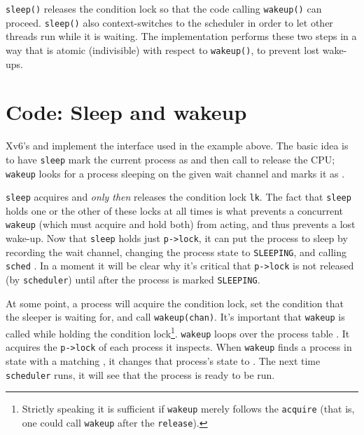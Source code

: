{\tt sleep()} releases the condition lock so that the code calling
{\tt wakeup()} can proceed. {\tt sleep()} also context-switches to the
scheduler in order to let other threads run while it is waiting. The
implementation performs these two steps in a way that is atomic
(indivisible) with respect to {\tt wakeup()}, to prevent lost
wake-ups.

\section{Code: Sleep and wakeup}

Xv6's
and
implement the interface used in the example above.
The basic idea is to have
\lstinline{sleep}
mark the current process as
and then call
to release the CPU;
\lstinline{wakeup}
looks for a process sleeping on the given wait channel
and marks it as 
.

\lstinline{sleep}
acquires 
and {\it only then} releases
the condition lock
\lstinline{lk}.
The fact that \lstinline{sleep}
holds one or the other of these locks at all times is what
prevents a concurrent \lstinline{wakeup}
(which must acquire and hold both) from acting,
and thus prevents a lost wake-up.
Now that
\lstinline{sleep}
holds just
\lstinline{p->lock},
it can put the process to sleep by recording
the wait channel,
changing the process state to \texttt{SLEEPING},
and calling
\lstinline{sched}
.
In a moment it will be clear why it's critical that
\lstinline{p->lock} is not released (by \lstinline{scheduler}) until after
the process is marked \texttt{SLEEPING}.

At some point, a process will acquire the condition lock,
set the condition that the sleeper is waiting for,
and call \lstinline{wakeup(chan)}.
It's important that \lstinline{wakeup} is called
while holding the condition lock\footnote{%
%
Strictly speaking it is sufficient if
\lstinline{wakeup}
merely follows the
\lstinline{acquire}
(that is, one could call
\lstinline{wakeup}
after the
\lstinline{release}).%
%
}.
\lstinline{wakeup}
loops over the process table
.
It acquires the
\lstinline{p->lock}
of each process it inspects.
When \lstinline{wakeup} finds a process in state
with a matching
,
it changes that process's state to
.
The next time \lstinline{scheduler} runs, it will
see that the process is ready to be run.


